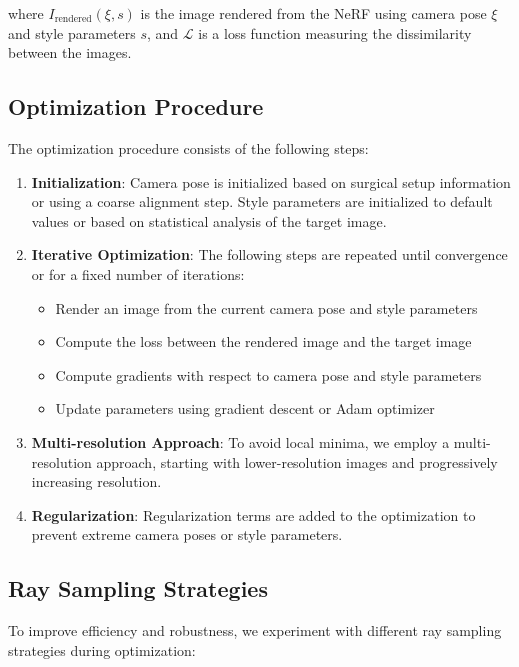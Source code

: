 where $I_{\text{rendered}}(\xi, s)$ is the image rendered from the NeRF using camera pose $\xi$ and style parameters $s$, and $\mathcal{L}$ is a loss function measuring the dissimilarity between the images.

\subsection{Optimization Procedure}

The optimization procedure consists of the following steps:

\begin{enumerate}
    \item \textbf{Initialization}: Camera pose is initialized based on surgical setup information or using a coarse alignment step. Style parameters are initialized to default values or based on statistical analysis of the target image.
    
    \item \textbf{Iterative Optimization}: The following steps are repeated until convergence or for a fixed number of iterations:
    \begin{itemize}
        \item Render an image from the current camera pose and style parameters
        \item Compute the loss between the rendered image and the target image
        \item Compute gradients with respect to camera pose and style parameters
        \item Update parameters using gradient descent or Adam optimizer
    \end{itemize}
    
    \item \textbf{Multi-resolution Approach}: To avoid local minima, we employ a multi-resolution approach, starting with lower-resolution images and progressively increasing resolution.
    
    \item \textbf{Regularization}: Regularization terms are added to the optimization to prevent extreme camera poses or style parameters.
\end{enumerate}

\subsection{Ray Sampling Strategies}

To improve efficiency and robustness, we experiment with different ray sampling strategies during optimization:

